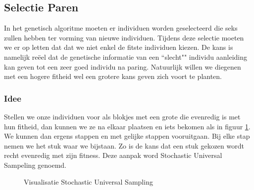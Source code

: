 %
\subsection{Selectie Paren}
\label{sub:SUS}
In het genetisch algoritme moeten er individuen worden geselecteerd die seks zullen hebben ter vorming van nieuwe individuen.
Tijdens deze selectie moeten we er op letten dat dat we niet enkel de fitste individuen kiezen. De kans is namelijk reëel dat de genetische informatie van een ``slecht"" individu aanleiding kan geven tot een zeer goed individu na paring. Natuurlijk willen we diegenen met een hogere fitheid wel een grotere kans geven zich voort te planten.

\subsubsection{Idee}
Stellen we onze individuen voor als blokjes met een grote die evenredig is met hun fitheid, dan kunnen we ze na elkaar plaatsen en iets bekomen als in figuur \ref{fig:SUS}. 
We kunnen dan ergens stappen en met gelijke stappen vooruitgaan. Bij elke stap nemen we het stuk waar we bijstaan. Zo is de kans dat een stuk gekozen wordt recht evenredig met zijn fitness. Deze aanpak word Stochastic Universal Sampeling genoemd.

\begin{center}
\begin{figure}[H]
\centering
{}
\caption{Visualisatie Stochastic Universal Sampling}
\label{fig:SUS}
\end{figure}
\end{center}



